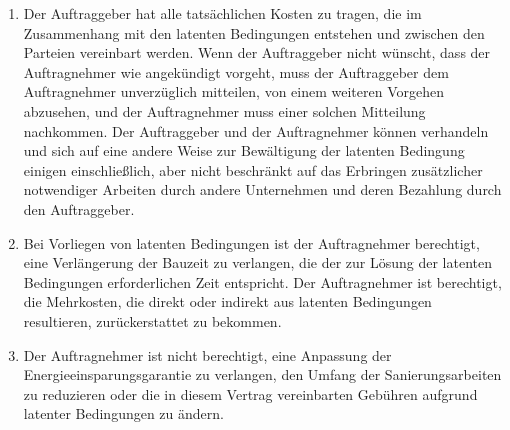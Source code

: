 \begin{multicols}{2}
\begin{enumerate}
\begin{enumerate}
   \end{enumerate}
   \item Der Auftraggeber hat alle tatsächlichen Kosten zu tragen, die im Zusammenhang mit den latenten Bedingungen entstehen und zwischen den Parteien vereinbart werden. Wenn der Auftraggeber nicht wünscht, dass der Auftragnehmer wie angekündigt vorgeht, muss der Auftraggeber dem Auftragnehmer unverzüglich mitteilen, von einem weiteren Vorgehen abzusehen, und der Auftragnehmer muss einer solchen Mitteilung nachkommen. Der Auftraggeber und der Auftragnehmer können verhandeln und sich auf eine andere Weise zur Bewältigung der latenten Bedingung einigen einschließlich, aber nicht beschränkt auf das Erbringen zusätzlicher notwendiger Arbeiten durch andere Unternehmen und deren Bezahlung durch den Auftraggeber.
   \item Bei Vorliegen von latenten Bedingungen ist der Auftragnehmer berechtigt, eine Verlängerung der Bauzeit zu verlangen, die der zur Lösung der latenten Bedingungen erforderlichen Zeit entspricht. Der Auftragnehmer ist berechtigt, die Mehrkosten, die direkt oder indirekt aus latenten Bedingungen resultieren, zurückerstattet zu bekommen.
   \item Der Auftragnehmer ist nicht berechtigt, eine Anpassung der Energieeinsparungsgarantie zu verlangen, den Umfang der Sanierungsarbeiten zu reduzieren oder die in diesem Vertrag vereinbarten Gebühren aufgrund latenter Bedingungen zu ändern.
  \end{enumerate}


\end{multicols}
